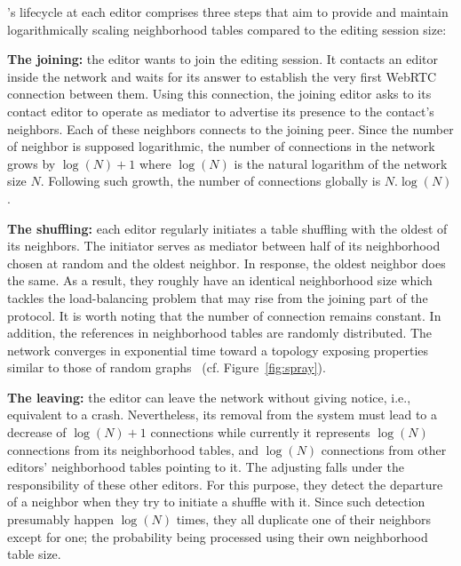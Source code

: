 \SPRAY's lifecycle at each editor comprises three steps that aim to provide and
maintain logarithmically scaling neighborhood tables compared to the editing
session size:
\begin{asparadesc}
\item [\textbf{The joining:}] the editor wants to join the editing session. It
  contacts an editor inside the network and waits for its answer to establish
  the very first WebRTC connection between them. Using this connection, the
  joining editor asks to its contact editor to operate as mediator to advertise
  its presence to the contact's neighbors. Each of these neighbors connects to
  the joining peer. Since the number of neighbor is supposed logarithmic, the
  number of connections in the network grows by $\log(N)+1$ where $\log(N)$ is
  the natural logarithm of the network size $N$. Following such growth, the
  number of connections globally is $N.\log(N)$.
\item [\textbf{The shuffling:}] each editor regularly initiates a table
  shuffling with the oldest of its neighbors. The initiator serves as mediator
  between half of its neighborhood chosen at random and the oldest neighbor. In
  response, the oldest neighbor does the same. As a result, they roughly have an
  identical neighborhood size which tackles the load-balancing problem that may
  rise from the joining part of the protocol. It is worth noting that the number
  of connection remains constant. In addition, the references in neighborhood
  tables are randomly distributed. The network converges in exponential time
  toward a topology exposing properties similar to those of random
  graphs~\cite{erdos1959random} (cf. Figure~\ref{fig:spray}).
\item [\textbf{The leaving:}] the editor can leave the network without giving
  notice, i.e., equivalent to a crash. Nevertheless, its removal from the system
  must lead to a decrease of $\log(N)+1$ connections while currently it
  represents $\log(N)$ connections from its neighborhood tables, and $\log(N)$
  connections from other editors' neighborhood tables pointing to it. The
  adjusting falls under the responsibility of these other editors. For this
  purpose, they detect the departure of a neighbor when they try to initiate a
  shuffle with it. Since such detection presumably happen $\log(N)$ times, they
  all duplicate one of their neighbors except for one; the probability being
  processed using their own neighborhood table size. 
\end{asparadesc}

